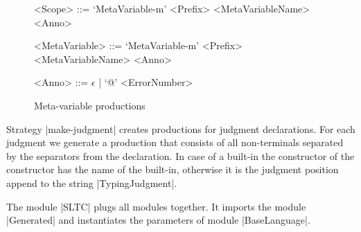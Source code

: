 \begin{figure}
\begin{grammar}
  <Scope> ::= `MetaVariable-m' <Prefix> <MetaVariableName> <Anno>

  <MetaVariable> ::= `MetaVariable-m' <Prefix> <MetaVariableName>
  <Anno>

  <Anno> ::= $\epsilon$ | `@' <ErrorNumber>
\end{grammar}
\caption{Meta-variable productions}
\label{fig:meta-variable-productions}
\end{figure}

Strategy \code|make-judgment| creates productions for judgment
declarations. For each judgment we generate a production that consists
of all non-terminals separated by the separators from the
declaration. In case of a built-in the constructor of the constructor
has the name of the built-in, otherwise it is the judgment position
append to the string \code|TypingJudgment|.

The module \code|SLTC| plugs all modules together. It imports the
module \code|Generated| and instantiates the parameters of module
\code|BaseLanguage|.

